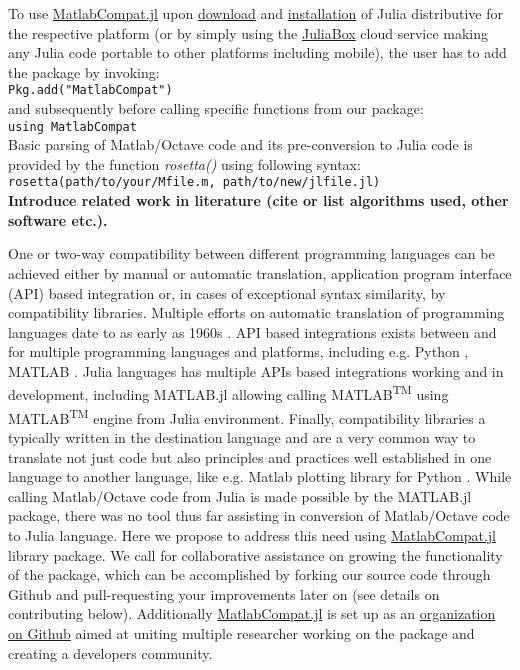 To use \href{https://github.com/MatlabCompat/MatlabCompat.jl}{MatlabCompat.jl} upon \href{http://julialang.org/downloads/}{download} and \href{http://docs.julialang.org/en/release-0.3/manual/getting-started/}{installation} of Julia distributive for the respective platform (or by simply using the \href{https://www.juliabox.org/}{JuliaBox} cloud service making any Julia code portable to other platforms including mobile), the user has to add the package by invoking:\\

\verb|Pkg.add("MatlabCompat")|\\

and subsequently before calling specific functions from our package:\\

\verb|using MatlabCompat|\\

Basic parsing of Matlab/Octave code and its pre-conversion to Julia code is provided by the function \textit{rosetta()} using following syntax:\\

\verb|rosetta(path/to/your/Mfile.m, path/to/new/jlfile.jl)|\\

\textbf{Introduce related work in literature (cite or list algorithms used, other software etc.).}

One or two-way compatibility between different programming languages can be achieved either by manual or automatic translation, application program interface (API) based integration or, in cases of exceptional syntax similarity, by compatibility libraries. Multiple efforts on automatic translation of programming languages date to as early as 1960s \cite{Ledley_1962, irons1961syntax}. API based integrations exists between and for multiple programming languages and platforms, including e.g. Python \cite{autin2012upy}, MATLAB \cite{Bornstein_2008}. Julia languages has multiple APIs based integrations working and in development, including MATLAB.jl allowing calling MATLAB\textsuperscript{TM} using MATLAB\textsuperscript{TM} engine from Julia environment. Finally, compatibility libraries a typically written in the destination language and are a very common way to translate not just code but also principles and practices well established in one language to another language, like e.g. Matlab plotting library for Python \cite{Hunter_2007, barrett2005matplotlib}. While calling Matlab/Octave code from Julia is made possible by the MATLAB.jl package, there was no tool thus far assisting in conversion of Matlab/Octave 
code to Julia language. Here we propose to address this need using \href{https://github.com/MatlabCompat/MatlabCompat.jl}{MatlabCompat.jl} library package. We call for collaborative assistance on growing the functionality of the package, which can be accomplished by forking our source code through Github and pull-requesting your improvements later on (see details on contributing below). Additionally \href{http://matlabcompat.github.io/}{MatlabCompat.jl} is set up as an \href{https://github.com/MatlabCompat}{organization on Github} aimed at uniting multiple researcher working on the package and creating a developers community.
  
  
  
  
  
  
  
  
  
  
  
  
  
  
  